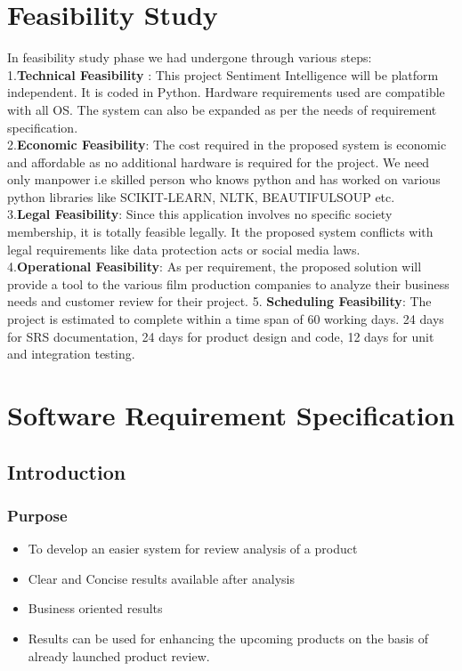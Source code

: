 \section{Feasibility Study}
In feasibility study phase we had undergone through various steps:\\
1.\textbf{Technical Feasibility} : This project Sentiment Intelligence will be platform independent. It
is coded in Python. Hardware requirements used are compatible with all OS. The system can also be expanded as per the needs of requirement specification.\\
2.\textbf{Economic Feasibility}: The cost required in the proposed system is economic and
affordable as no additional hardware is required for the project. We need only manpower
i.e skilled person who knows python and has worked on various python libraries like
SCIKIT-LEARN, NLTK, BEAUTIFULSOUP etc.\\
3.\textbf{Legal Feasibility}: Since this application involves no specific society membership, it is
totally feasible legally. It the proposed system conflicts with legal requirements like data
protection acts or social media laws.\\
4.\textbf{Operational Feasibility}: As per requirement, the proposed solution will provide a tool to
the various film production companies to analyze their business needs and customer review for their project.
5.\textbf{ Scheduling Feasibility}: The project is estimated to complete within a time span of 60
working days. 24 days for SRS documentation, 24 days for product design and code, 12
days for unit and integration testing.

\section{Software Requirement Specification}

\subsection{\textbf{Introduction}}

\subsubsection{Purpose}
\begin{itemize}
	\item To develop an easier system for review analysis of a product
	\item Clear and Concise results available after analysis
	\item Business oriented results
	\item Results can be used for enhancing the upcoming products on the basis of already launched product review.  
\end{itemize}

